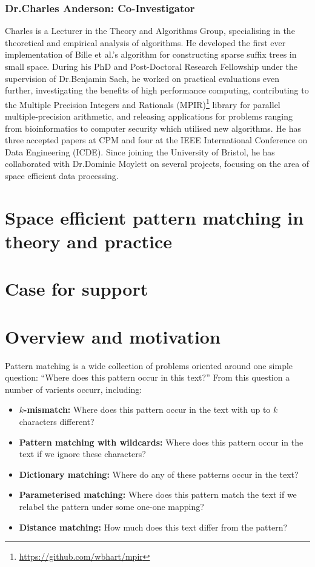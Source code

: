 \documentclass[a4paper,11pt]{article}
\begin{document}
    \subsubsection*{Dr.\@ Charles Anderson: Co-Investigator}

    Charles is a Lecturer in the Theory and Algorithms Group, specialising in the theoretical and empirical analysis of algorithms. He developed the first ever implementation of Bille et al.'s algorithm for constructing sparse suffix trees in small space. During his PhD and Post-Doctoral Research Fellowship under the supervision of Dr.\@ Benjamin Sach, he worked on practical evaluations even further, investigating the benefits of high performance computing, contributing to the Multiple Precision Integers and Rationals (MPIR)\footnote{\url{https://github.com/wbhart/mpir}} library for parallel multiple-precision arithmetic, and releasing applications for problems ranging from bioinformatics to computer security which utilised new algorithms. He has three accepted papers at CPM and four at the IEEE International Conference on Data Engineering (ICDE). Since joining the University of Bristol, he has collaborated with Dr.\@ Dominic Moylett on several projects, focusing on the area of space efficient data processing.

    \newpage
    \section*{Space efficient pattern matching in theory and practice}
    \section*{Case for support}

    \section{Overview and motivation}

    Pattern matching is a wide collection of problems oriented around one simple question: ``Where does this pattern occur in this text?'' From this question a number of varients occurr, including:

    \begin{itemize}
        \item \textbf{$k$-mismatch:} Where does this pattern occur in the text with up to $k$ characters different?
        \item \textbf{Pattern matching with wildcards:} Where does this pattern occur in the text if we ignore these characters?
        \item \textbf{Dictionary matching:} Where do any of these patterns occur in the text?
        \item \textbf{Parameterised matching:} Where does this pattern match the text if we relabel the pattern under some one-one mapping?
        \item \textbf{Distance matching:} How much does this text differ from the pattern?
    \end{itemize}
\end{document}
